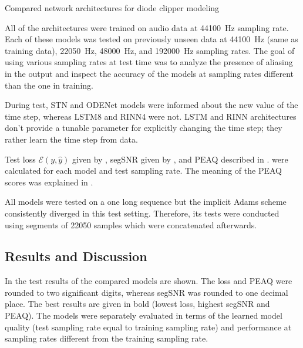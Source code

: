 \begin{table}[]
    
    \caption{Compared network architectures for diode clipper modeling}
    \label{tab:diode_clipper_models_data}
\end{table}

All of the architectures were trained on audio data at \SI{44100}{Hz} sampling rate. Each of these models was tested on previously unseen data at \SI{44100}{Hz} (same as training data), \SI{22050}{Hz}, \SI{48000}{Hz}, and \SI{192000}{Hz} sampling rates. The goal of using various sampling rates at test time was to analyze the presence of aliasing in the output and inspect the accuracy of the models at sampling rates different than the one in training. 

During test, \ac{STN} and ODENet models were informed about the new value of the time step, whereas \ac{LSTM}8 and \ac{RINN}4 were not. \ac{LSTM} and \ac{RINN} architectures don't provide a tunable parameter for explicitly changing the time step; they rather learn the time step from data.

Test loss $\mathcal{E}(y, \hat{y})$ given by , \ac{segSNR} given by , and \ac{PEAQ} described in .
were calculated for each model and test sampling rate. The meaning of the \ac{PEAQ} scores was explained in .

All models were tested on a one long sequence but the implicit Adams scheme consistently diverged in this test setting. Therefore, its tests were conducted using segments of 22050 samples which were concatenated afterwards.

\subsection{Results and Discussion}
\label{sec:diode_clipper_results}

In  the test results of the compared models are shown. The loss and \ac{PEAQ} were rounded to two significant digits, whereas \ac{segSNR} was rounded to one decimal place. The best results are given in bold (lowest loss, highest \ac{segSNR} and \ac{PEAQ}). The models were separately evaluated in terms of the learned model quality (test sampling rate equal to training sampling rate) and performance at sampling rates different from the training sampling rate. 

